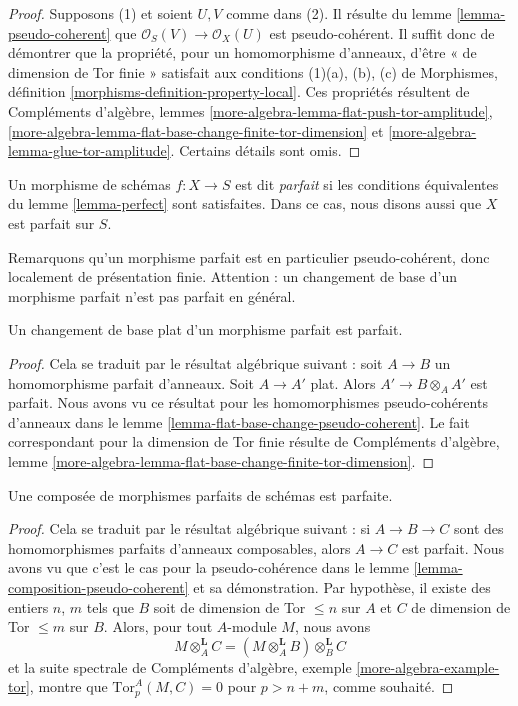 \begin{proof}
Supposons (1) et soient $U, V$ comme dans (2).
Il résulte du
lemme \ref{lemma-pseudo-coherent}
que $\mathcal{O}_S(V) \to \mathcal{O}_X(U)$ est pseudo-cohérent.
Il suffit donc de démontrer que la propriété, pour un homomorphisme d'anneaux,
d'être « de dimension de Tor finie » satisfait aux
conditions (1)(a), (b), (c) de
Morphismes, définition \ref{morphisms-definition-property-local}.
Ces propriétés résultent de
Compléments d'algèbre,
lemmes \ref{more-algebra-lemma-flat-push-tor-amplitude},
\ref{more-algebra-lemma-flat-base-change-finite-tor-dimension} et
\ref{more-algebra-lemma-glue-tor-amplitude}.
Certains détails sont omis.
\end{proof}

\begin{definition}
\label{definition-perfect}
Un morphisme de schémas $f : X \to S$ est dit {\it parfait}
si les conditions équivalentes du
lemme \ref{lemma-perfect}
sont satisfaites. Dans ce cas, nous disons aussi que $X$ est parfait
sur $S$.
\end{definition}

\noindent
Remarquons qu'un morphisme parfait est en particulier pseudo-cohérent, donc
localement de présentation finie. Attention : un changement de base d'un
morphisme parfait n'est pas parfait en général.

\begin{lemma}
\label{lemma-flat-base-change-perfect}
Un changement de base plat d'un morphisme parfait est parfait.
\end{lemma}

\begin{proof}
Cela se traduit par le résultat algébrique suivant :
soit $A \to B$ un homomorphisme parfait d'anneaux.
Soit $A \to A'$ plat. Alors $A' \to B \otimes_A A'$ est
parfait. Nous avons vu ce résultat pour les homomorphismes pseudo-cohérents d'anneaux dans le
lemme \ref{lemma-flat-base-change-pseudo-coherent}.
Le fait correspondant pour la dimension de Tor finie résulte de
Compléments d'algèbre,
lemme \ref{more-algebra-lemma-flat-base-change-finite-tor-dimension}.
\end{proof}

\begin{lemma}
\label{lemma-composition-perfect}
Une composée de morphismes parfaits de schémas est parfaite.
\end{lemma}

\begin{proof}
Cela se traduit par le résultat algébrique suivant :
si $A \to B \to C$ sont des homomorphismes parfaits d'anneaux composables,
alors $A \to C$ est parfait. Nous avons vu que c'est le cas pour la
pseudo-cohérence dans le
lemme \ref{lemma-composition-pseudo-coherent}
et sa démonstration. Par hypothèse, il existe des entiers $n$, $m$ tels
que $B$ soit de dimension de Tor $\leq n$ sur $A$ et $C$ de dimension de Tor
$\leq m$ sur $B$. Alors, pour tout $A$-module $M$, nous avons
$$
M \otimes_A^{\mathbf{L}} C =
(M \otimes_A^{\mathbf{L}} B) \otimes_B^{\mathbf{L}} C
$$
et la suite spectrale de
Compléments d'algèbre, exemple \ref{more-algebra-example-tor},
montre que $\text{Tor}^A_p(M, C) = 0$ pour $p > n + m$, comme souhaité.
\end{proof}


